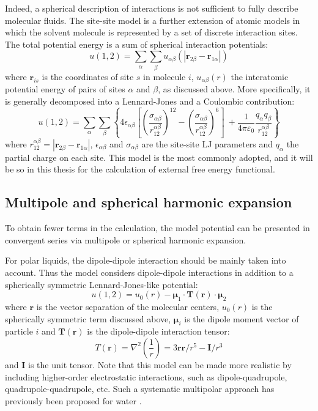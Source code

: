 Indeed, a spherical description of interactions is not sufficient
to fully describe molecular fluids. The site-site model is a further
extension of atomic models in which the solvent molecule is represented
by a set of discrete interaction sites. The total potential energy
is a sum of spherical interaction potentials:
\begin{equation}
u(1,2)=\sum_{\alpha}\sum_{\beta}u_{\alpha\beta}(\left|\mathbf{r}_{2\beta}-\mathbf{r}_{1\alpha}\right|)
\end{equation}
where $\mathbf{r}_{is}$ is the coordinates of site $s$ in molecule
$i$, $u_{\alpha\beta}(r)$ the interatomic potential energy of pairs
of sites $\alpha$ and $\beta$, as discussed above. More specifically,
it is generally decomposed into a Lennard-Jones and a Coulombic contribution:
\begin{equation}
u(1,2)=\sum_{\alpha}\sum_{\beta}\left\{ 4\epsilon_{\alpha\beta}\left[\left(\frac{\sigma_{\alpha\beta}}{r_{12}^{\alpha\beta}}\right)^{12}-\left(\frac{\sigma_{\alpha\beta}}{r_{12}^{\alpha\beta}}\right)^{6}\right]\:+\frac{1}{4\pi\varepsilon_{0}}\frac{q_{\alpha}q_{\beta}}{r_{12}^{\alpha\beta}}\right\} 
\end{equation}
where $r_{12}^{\alpha\beta}=\left|\mathbf{r}_{2\beta}-\mathbf{r}_{1\alpha}\right|$,
$\epsilon_{\alpha\beta}$ and $\sigma_{\alpha\beta}$ are the site-site
LJ parameters and $q_{\alpha}$ the partial charge on each site. This
model is the most commonly adopted, and it will be so in this thesis
for the calculation of external free energy functional.

\subsection{Multipole and spherical harmonic expansion}

To obtain fewer terms in the calculation, the model potential can
be presented in convergent series via multipole or spherical harmonic
expansion.

For polar liquids, the dipole-dipole interaction should be mainly
taken into account. Thus the model considers dipole-dipole interactions
in addition to a spherically symmetric Lennard-Jones-like potential:
\begin{equation}
u(1,2)=u_{0}(r)-\boldsymbol{\mu}_{1}\cdot\mathbf{T}(\mathbf{r})\cdot\boldsymbol{\mu}_{2}
\end{equation}
where $\mathbf{r}$ is the vector separation of the molecular centers,
$u_{0}(r)$ is the spherically symmetric term discussed above, $\boldsymbol{\mu}_{i}$
is the dipole moment vector of particle $i$ and $\mathbf{T}(\mathbf{r})$
is the dipole-dipole interaction tensor:
\begin{equation}
T(\mathbf{r})=\nabla^{2}\left(\dfrac{1}{r}\right)=3\mathbf{r}\mathbf{r}/r^{5}-\mathbf{I}/r^{3}
\end{equation}
and $\mathbf{I}$ is the unit tensor. Note that this model can be
made more realistic by including higher-order electrostatic interactions,
such as dipole-quadrupole, quadrupole-quadrupole, etc. Such a systematic
multipolar approach has previously been proposed for water \citep{Chowdhuri_2006}.

